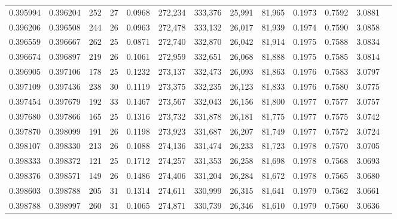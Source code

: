 \begin{tabular}{rrrrrrrrrrrrr}
0.395994 & 0.396204 &    252 &    27 &                                     0.0968 & 272,234 & 333,376 &  25,991 &  81,965 & 0.1973 & 0.7592 & 3.0881 \\
0.396206 & 0.396508 &    244 &    26 &                                     0.0963 & 272,478 & 333,132 &  26,017 &  81,939 & 0.1974 & 0.7590 & 3.0858 \\
0.396559 & 0.396667 &    262 &    25 &                                     0.0871 & 272,740 & 332,870 &  26,042 &  81,914 & 0.1975 & 0.7588 & 3.0834 \\
0.396674 & 0.396897 &    219 &    26 &                                     0.1061 & 272,959 & 332,651 &  26,068 &  81,888 & 0.1975 & 0.7585 & 3.0814 \\
0.396905 & 0.397106 &    178 &    25 &                                     0.1232 & 273,137 & 332,473 &  26,093 &  81,863 & 0.1976 & 0.7583 & 3.0797 \\
0.397109 & 0.397436 &    238 &    30 &                                     0.1119 & 273,375 & 332,235 &  26,123 &  81,833 & 0.1976 & 0.7580 & 3.0775 \\
0.397454 & 0.397679 &    192 &    33 &                                     0.1467 & 273,567 & 332,043 &  26,156 &  81,800 & 0.1977 & 0.7577 & 3.0757 \\
0.397680 & 0.397866 &    165 &    25 &                                     0.1316 & 273,732 & 331,878 &  26,181 &  81,775 & 0.1977 & 0.7575 & 3.0742 \\
0.397870 & 0.398099 &    191 &    26 &                                     0.1198 & 273,923 & 331,687 &  26,207 &  81,749 & 0.1977 & 0.7572 & 3.0724 \\
0.398107 & 0.398330 &    213 &    26 &                                     0.1088 & 274,136 & 331,474 &  26,233 &  81,723 & 0.1978 & 0.7570 & 3.0705 \\
0.398333 & 0.398372 &    121 &    25 &                                     0.1712 & 274,257 & 331,353 &  26,258 &  81,698 & 0.1978 & 0.7568 & 3.0693 \\
0.398376 & 0.398571 &    149 &    26 &                                     0.1486 & 274,406 & 331,204 &  26,284 &  81,672 & 0.1978 & 0.7565 & 3.0680 \\
0.398603 & 0.398788 &    205 &    31 &                                     0.1314 & 274,611 & 330,999 &  26,315 &  81,641 & 0.1979 & 0.7562 & 3.0661 \\
0.398788 & 0.398997 &    260 &    31 &                                     0.1065 & 274,871 & 330,739 &  26,346 &  81,610 & 0.1979 & 0.7560 & 3.0636 \\

\end{tabular}
